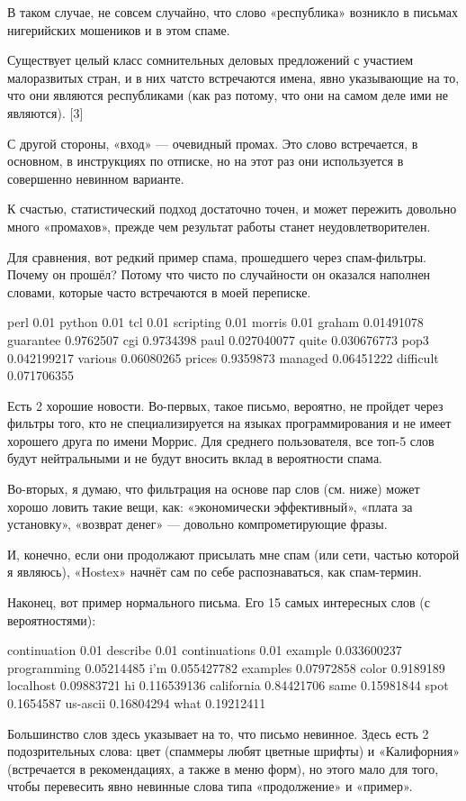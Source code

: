 \documentclass[ebook,12pt,oneside,openany]{memoir}
\begin{document}
В таком случае, не совсем случайно, что слово «республика» возникло в
письмах нигерийских мошеников и в этом спаме.

Существует целый класс сомнительных деловых предложений с участием
малоразвитых стран, и в них чатсто встречаются имена, явно указывающие
на то, что они являются республиками (как раз потому, что они на самом
деле ими не являются). [3]

С другой стороны, «вход» — очевидный промах. Это слово встречается, в
основном, в инструкциях по отписке, но на этот раз они используется в
совершенно невинном варианте.

К счастью, статистический подход достаточно точен, и может пережить
довольно много «промахов», прежде чем результат работы станет
неудовлетворителен.

Для сравнения, вот редкий пример спама, прошедшего через спам-фильтры.
Почему он прошёл? Потому что чисто по случайности он оказался наполнен
словами, которые часто встречаются в моей переписке.

perl 0.01 python 0.01 tcl 0.01 scripting 0.01 morris 0.01 graham
0.01491078 guarantee 0.9762507 cgi 0.9734398 paul 0.027040077 quite
0.030676773 pop3 0.042199217 various 0.06080265 prices 0.9359873
managed 0.06451222 difficult 0.071706355


Есть 2 хорошие новости. Во-первых, такое письмо, вероятно, не пройдет
через фильтры того, кто не специализируется на языках программирования
и не имеет хорошего друга по имени Моррис. Для среднего пользователя,
все топ-5 слов будут нейтральными и не будут вносить вклад в
вероятности спама.

Во-вторых, я думаю, что фильтрация на основе пар слов (см. ниже) может
хорошо ловить такие вещи, как: «экономически эффективный», «плата за
установку», «возврат денег» — довольно компрометирующие фразы.

И, конечно, если они продолжают присылать мне спам (или сети, частью
которой я являюсь), «Hostex» начнёт сам по себе распознаваться, как
спам-термин.

Наконец, вот пример нормального письма. Его 15 самых интересных слов
(с вероятностями):

continuation 0.01 describe 0.01 continuations 0.01 example 0.033600237
programming 0.05214485 i’m 0.055427782 examples 0.07972858 color
0.9189189 localhost 0.09883721 hi 0.116539136 california 0.84421706
same 0.15981844 spot 0.1654587 us-ascii 0.16804294 what 0.19212411


Большинство слов здесь указывает на то, что письмо невинное. Здесь
есть 2 подозрительных слова: цвет (спаммеры любят цветные шрифты) и
«Калифорния» (встречается в рекомендациях, а также в меню форм), но
этого мало для того, чтобы перевесить явно невинные слова типа
«продолжение» и «пример».
\end{document}
